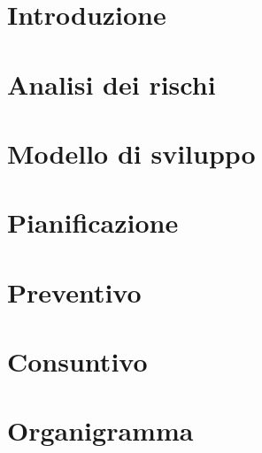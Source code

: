 \documentclass{article}
\begin{document}


\section{Introduzione}
\label{sec:introduzione}
\label{sec:introduzione}


\newpage
\section{Analisi dei rischi}
\label{sec:rischi}


\newpage
\section{Modello di sviluppo}
\label{sec:sviluppo}


\newpage
\section{Pianificazione}
\label{sec:pianif}


\newpage
\section{Preventivo}
\label{sec:prev}


\newpage
\section{Consuntivo}
\label{sec:cons}


\newpage
\section{Organigramma}
\label{sec:org}

\end{document}

